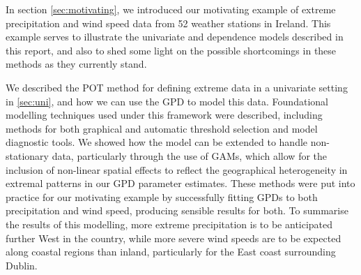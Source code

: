 \documentclass{article}
\numberwithin{equation}{section}
\begin{document}
In section \ref{sec:motivating}, we introduced our motivating example of extreme precipitation and wind speed data from 52 weather stations in Ireland. 
This example serves to illustrate the univariate and dependence models described in this report, and also to shed some light on the possible shortcomings in these methods as they currently stand.

We described the POT method for defining extreme data in a univariate setting in \ref{sec:uni}, and how we can use the GPD to model this data. 
Foundational modelling techniques used under this framework were described, including methods for both graphical and automatic threshold selection and model diagnostic tools. 
We showed how the model can be extended to handle non-stationary data, particularly through the use of GAMs, which allow for the inclusion of non-linear spatial effects to reflect the  geographical heterogeneity in extremal patterns in our GPD parameter estimates. 
These methods were put into practice for our motivating example by successfully fitting GPDs to both precipitation and wind speed, producing sensible results for both. 
To summarise the results of this modelling, more extreme precipitation is to be anticipated further West in the country, while more severe wind speeds are to be expected along coastal regions than inland, particularly for the East coast surrounding Dublin. 
\end{document}
